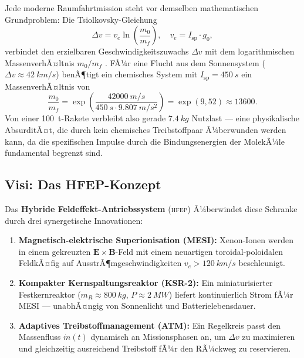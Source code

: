 ﻿\documentclass[a4paper,12pt,twoside]{article}
\theoremstyle{plain}
\theoremstyle{definition}
\theoremstyle{remark}
\newcommand{\Isp}{I_{\mathrm{sp}}}
\newcommand{\ve}{v_e}
\newcommand{\Dv}{\Delta v}
\newcommand{\mdot}{\dot{m}}
\newcommand{\mzero}{m_0}
\newcommand{\mf}{m_f}
\newcommand{\HFEP}{\textsc{hfep}}
\newcommand{\gzero}{g_0}
\begin{document}
	Jede moderne Raumfahrtmission steht vor demselben mathematischen Grundproblem:
	Die Tsiolkovsky-Gleichung
	\begin{equation}
		\Dv = \ve \ln\!\left(\frac{\mzero}{\mf}\right), \quad \ve = \Isp \cdot \gzero,
		\label{eq:tsiolkovsky}
	\end{equation}
	verbindet den erzielbaren Geschwindigkeitszuwachs $\Dv$ mit dem logarithmischen
	MassenverhÃ¤ltnis $\mzero/\mf$ \cite{tsiolkovsky1903, sutton2010}. FÃ¼r eine Flucht aus dem Sonnensystem
	($\Dv \approx \SI{42}{km/s}$) benÃ¶tigt ein chemisches System mit
	$\Isp = \SI{450}{s}$ ein MassenverhÃ¤ltnis von
	\begin{equation}
		\frac{\mzero}{\mf} = \exp\!\left(\frac{\SI{42000}{m/s}}{\SI{450}{s}\cdot\SI{9.807}{m/s^2}}\right)
		= \exp(9{,}52) \approx \num{13600}.
	\end{equation}
	Von einer \SI{100}{t}-Rakete verbleibt also gerade $\SI{7.4}{kg}$ Nutzlast ---
	eine physikalische AbsurditÃ¤t, die durch kein chemisches Treibstoffpaar Ã¼berwunden
	werden kann, da die spezifischen Impulse durch die Bindungsenergien der MolekÃ¼le
	fundamental begrenzt sind.
	
	\subsection{Visi: Das HFEP-Konzept}
	
	Das \textbf{Hybride Feldeffekt-Antriebssystem} (\HFEP) Ã¼berwindet diese Schranke
	durch drei synergetische Innovationen:
	
	\begin{enumerate}
		\item \textbf{Magnetisch-elektrische Superionisation (MESI):}
		Xenon-Ionen werden in einem gekreuzten $\mathbf{E}\times\mathbf{B}$-Feld
		mit einem neuartigen toroidal-poloidalen FeldkÃ¤fig auf
		AusstrÃ¶mgeschwindigkeiten $\ve > \SI{120}{km/s}$ beschleunigt.
		
		\item \textbf{Kompakter Kernspaltungsreaktor (KSR-2):}
		Ein miniaturisierter Festkernreaktor ($m_R \approx \SI{800}{kg}$,
		$P \approx \SI{2}{MW}$) liefert kontinuierlich Strom fÃ¼r MESI ---
		unabhÃ¤ngig von Sonnenlicht und Batterielebensdauer.
		
		\item \textbf{Adaptives Treibstoffmanagement (ATM):}
		Ein Regelkreis passt den Massenfluss $\mdot(t)$ dynamisch
		an Missionsphasen an, um $\Dv$ zu maximieren und gleichzeitig
		ausreichend Treibstoff fÃ¼r den RÃ¼ckweg zu reservieren.
	\end{enumerate}
	
\end{document}
